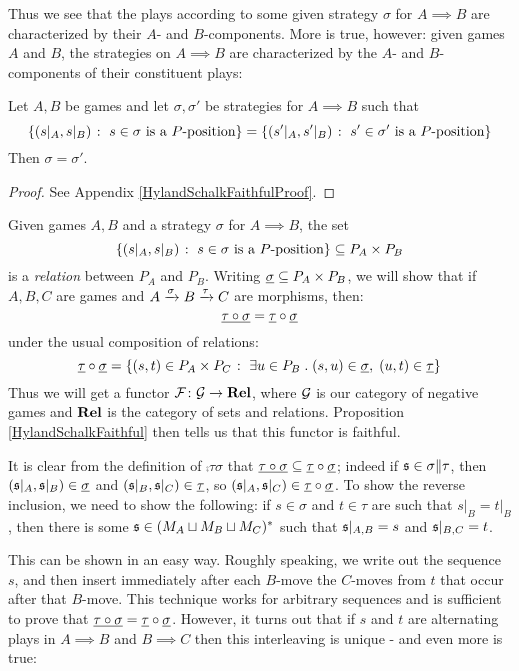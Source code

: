 \documentclass[11pt]{article} %
\begin{document}
Thus we see that the plays according to some given strategy $\sigma$ for $A\implies B$ are characterized by their $A$- and $B$-components.  More is true, however: given games $A$ and $B$, the strategies on $A\implies B$ are characterized by the $A$- and $B$-components of their constituent plays:
\begin{lemma}
  \label{HylandSchalkFaithful}
  Let $A,B$ be games and let $\sigma,\sigma'$ be strategies for $A\implies B$ such that
  \[
    \{(s\vert_A,s\vert_B)\;\colon\; \textrm{$s\in\sigma$ is a $P$-position}\}=\{(s'\vert_A,s'\vert_B)\;\colon\;\textrm{$s'\in\sigma'$ is a $P$-position}\}
    \]
  Then $\sigma=\sigma'$.
  \begin{proof}
    See Appendix \ref{HylandSchalkFaithfulProof}.
  \end{proof}
\end{lemma}

Given games $A,B$ and a strategy $\sigma$ for $A\implies B$, the set
\[
  \{(s\vert_A,s\vert_B)\;\colon\; \textrm{$s\in\sigma$ is a $P$-position}\}\subseteq P_A\times P_B
  \]
is a \emph{relation} between $P_A$ and $P_B$.  Writing $\underline{\sigma}\subseteq P_A\times P_B$, we will show that if $A,B,C$ are games and $A\xrightarrow{\sigma}B\xrightarrow{\tau} C$ are morphisms, then:
\[
  \underline{\tau \circ \sigma}=\underline{\tau} \circ \underline{\sigma}
  \]
under the usual composition of relations:
\[
  \underline{\tau} \circ \underline{\sigma} = \{(s,t)\in P_A\times P_C\;\colon\; \exists u\in P_B\;.\; (s,u)\in\underline{\sigma},\;(u,t)\in\underline{\tau}\}
  \]
Thus we will get a functor $\mathcal F\colon{}\mathcal G\to{}{\normalfont\textbf{Rel}}$, where $\mathcal G$ is our category of negative games and ${\normalfont\textbf{Rel}}$ is the category of sets and relations.  Proposition \ref{HylandSchalkFaithful} then tells us that this functor is faithful.  

It is clear from the definition of $\comp\tau\sigma$ that $\underline{\tau \circ \sigma}\subseteq\underline{\tau} \circ \underline{\sigma}$; indeed if $\mathfrak s\in\sigma\|\tau$, then $(\mathfrak s\vert_A,\mathfrak s\vert_B)\in\underline{\sigma}$ and $(\mathfrak s\vert_B,\mathfrak s\vert_C)\in\underline{\tau}$, so $(\mathfrak s\vert_A,\mathfrak s\vert_C)\in\underline{\tau} \circ \underline{\sigma}$.  To show the reverse inclusion, we need to show the following: if $s\in\sigma$ and $t\in\tau$ are such that $s\vert_B=t\vert_B$, then there is some $\mathfrak s\in (M_A\sqcup M_B\sqcup M_C)^*$ such that $\mathfrak s\vert_{A,B}=s$ and $\mathfrak s\vert_{B,C}=t$.  

This can be shown in an easy way.  Roughly speaking, we write out the sequence $s$, and then insert immediately after each $B$-move the $C$-moves from $t$ that occur after that $B$-move.  This technique works for arbitrary sequences and is sufficient to prove that $\underline{\tau \circ \sigma}=\underline{\tau} \circ \underline{\sigma}$.  However, it turns out that if $s$ and $t$ are alternating plays in $A\implies B$ and $B\implies C$ then this interleaving is unique - and even more is true:
\end{document}
